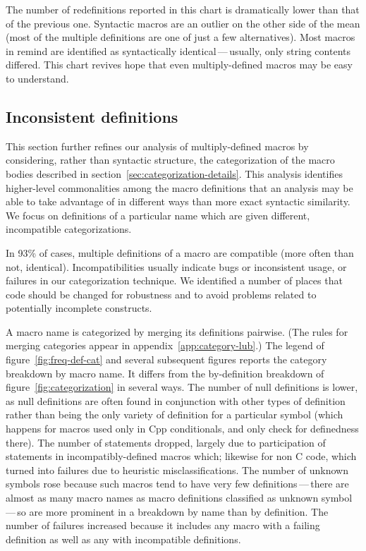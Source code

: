\documentclass[10pt]{article}
\newcommand{\pkg}[1]{\textsf{#1}}
\begin{document}
The number of redefinitions reported in this chart is dramatically lower
than that of the previous one.  Syntactic macros are an outlier on the
other side of the mean (most of the multiple definitions are one of just a
few alternatives).  Most macros in \pkg{remind} are identified as
syntactically identical\,---\,usually, only string contents differed.  This
chart revives hope that even multiply-defined macros may be easy to
understand.


\subsection{Inconsistent definitions}
\label{sec:inconsistent}

This section further refines our analysis of multiply-defined macros by
considering, rather than syntactic structure, the categorization of the
macro bodies described in section~\ref{sec:categorization-details}.  This
analysis identifies higher-level commonalities among the macro definitions
that an analysis may be able to take advantage of in different ways than
more exact syntactic similarity.  We focus on definitions of a particular
name which are given different, incompatible categorizations.

In 93\% of cases, multiple definitions of a macro are compatible (more
often than not, identical).  Incompatibilities usually indicate bugs or
inconsistent usage, or failures in our categorization technique.  We
identified a number of places that code should be changed for robustness
and to avoid problems related to potentially incomplete constructs.



A macro name is categorized by merging its definitions pairwise.  (The
rules for merging categories appear in appendix~\ref{app:category-lub}.)
The legend of figure~\ref{fig:freq-def-cat} and several subsequent figures
reports the category breakdown by macro name.  It differs from the
by-definition breakdown of figure~\ref{fig:categorization} in several ways.
The number of null definitions is lower, as null definitions are often
found in conjunction with other types of definition rather than being the
only variety of definition for a particular symbol (which happens for
macros used only in Cpp conditionals, and only check for definedness
there).  The number of statements dropped, largely due to participation of
statements in incompatibly-defined macros which; likewise for non C code,
which turned into failures due to heuristic misclassifications.  The number
of unknown symbols rose because such macros tend to have very few
definitions\,---\,there are almost as many macro names as macro definitions
classified as unknown symbol\,---\,so are more prominent in a breakdown by
name than by definition.  The number of failures increased because it
includes any macro with a failing definition as well as any with
incompatible definitions.
\end{document}
